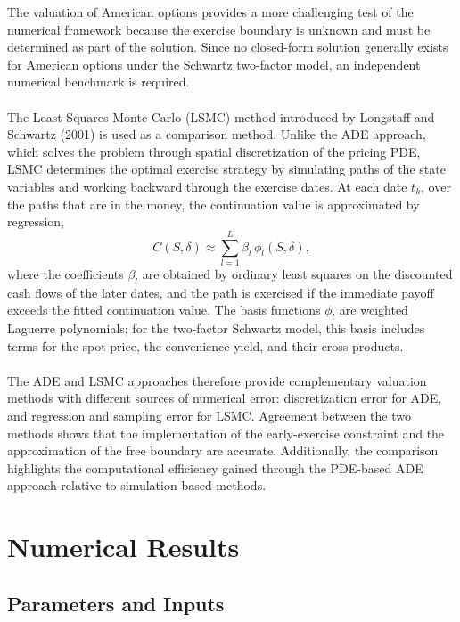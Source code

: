 \documentclass[12pt,a4paper]{article}
\begin{document}
The valuation of American options provides a more challenging test of the numerical framework because the exercise boundary is unknown and must be determined as part of the solution. Since no closed-form solution generally exists for American options under the Schwartz two-factor model, an independent numerical benchmark is required.\\\\
The Least Squares Monte Carlo (LSMC) method introduced by Longstaff and Schwartz (2001) is used as a comparison method. Unlike the ADE approach, which solves the problem through spatial discretization of the pricing PDE, LSMC determines the optimal exercise strategy by simulating paths of the state variables and working backward through the exercise dates. At each date $t_k$, over the paths that are in the money, the continuation value is approximated by regression,
\begin{equation}
C(S,\delta)\approx\sum_{l=1}^{L}\beta_l\,\phi_l(S,\delta),
\end{equation}
where the coefficients $\beta_l$ are obtained by ordinary least squares on the discounted cash flows of the later dates, and the path is exercised if the immediate payoff exceeds the fitted continuation value. The basis functions $\phi_l$ are weighted Laguerre polynomials; for the two-factor Schwartz model, this basis includes terms for the spot price, the convenience yield, and their cross-products.\\\\
The ADE and LSMC approaches therefore provide complementary valuation methods with different sources of numerical error: discretization error for ADE, and regression and sampling error for LSMC. Agreement between the two methods shows that the implementation of the early-exercise constraint and the approximation of the free boundary are accurate. Additionally, the comparison highlights the computational efficiency gained through the PDE-based ADE approach relative to simulation-based methods.

\newpage


\section{Numerical Results}\label{ch:results}

\subsection{Parameters and Inputs}\label{sec:params}
\end{document}
